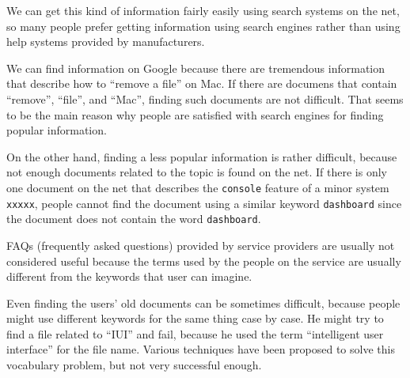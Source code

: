 \documentclass[manuscript,screen,review]{acmart}
\begin{document}
We can get this kind of information fairly easily using search systems on the net,
so many people prefer getting information using search engines rather than
using help systems provided by manufacturers.

We can find information on Google because there are tremendous information
that describe how to ``remove a file'' on Mac.
If there are documens that contain ``remove'', ``file'', and ``Mac'',
finding such documents are not difficult.
That seems to be the main reason why people are satisfied with search engines
for finding popular information.



On the other hand,
finding a less popular information is rather difficult,
because not enough documents related to the topic is found on the net.
%
If there is only one document on the net
that describes the \texttt{console} feature of a minor system \texttt{xxxxx},
people cannot find the document using a similar keyword \texttt{dashboard}
since the document does not contain the word \texttt{dashboard}.



FAQs (frequently asked questions) provided by service providers are
usually not considered useful
because the terms used by the people on the service are usually
different from the keywords that user can imagine.


Even finding the users' old documents can be sometimes difficult,
because people might use different keywords for the same thing case by case.
He might try to find a file related to ``IUI'' and fail, because he used
the term ``intelligent user interface'' for the file name.
%
Various techniques have been proposed to solve this vocabulary problem\cite{Furnas},
but not very successful enough.
\end{document}
